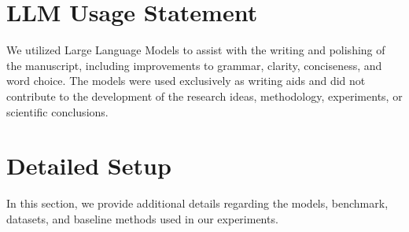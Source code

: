 \section{LLM Usage Statement}
We utilized Large Language Models to assist with the writing and polishing of the manuscript, including improvements to grammar, clarity, conciseness, and word choice. The models were used exclusively as writing aids and did not contribute to the development of the research ideas, methodology, experiments, or scientific conclusions.


\section{Detailed Setup}
\label{app:detailed-setup}
In this section, we provide additional details regarding the models, benchmark, datasets, and baseline methods used in our experiments.


